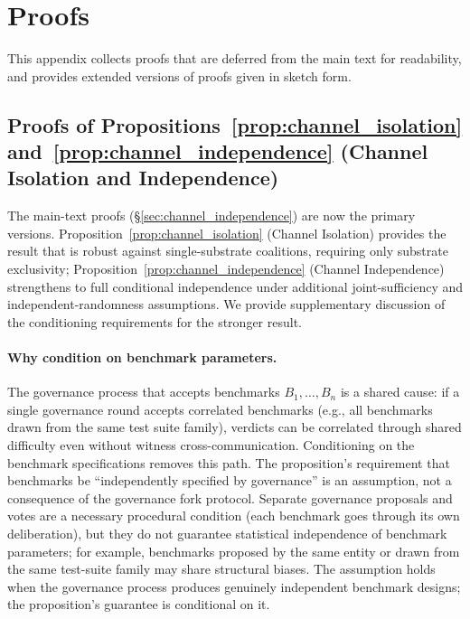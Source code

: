 \section{Proofs}
\label{app:proofs}

This appendix collects proofs that are deferred from the main text
for readability, and provides extended versions of proofs given in
sketch form.

\subsection{Proofs of Propositions~\ref{prop:channel_isolation}
and~\ref{prop:channel_independence}
(Channel Isolation and Independence)}
\label{app:channel_independence}

The main-text proofs (\S\ref{sec:channel_independence}) are now the
primary versions.  Proposition~\ref{prop:channel_isolation} (Channel
Isolation) provides the result that is robust against single-substrate
coalitions, requiring only substrate exclusivity;
Proposition~\ref{prop:channel_independence}
(Channel Independence) strengthens to full conditional independence
under additional joint-sufficiency and independent-randomness
assumptions.
We provide supplementary discussion of the conditioning requirements
for the stronger result.

\paragraph{Why condition on benchmark parameters.}
The governance process that accepts benchmarks $B_1, \ldots, B_n$ is
a shared cause: if a single governance round accepts correlated
benchmarks (e.g., all benchmarks drawn from the same test suite family),
verdicts can be correlated through shared difficulty even without
witness cross-communication.  Conditioning on the benchmark specifications
removes this path.  The proposition's requirement that benchmarks be
``independently specified by governance'' is an assumption, not a
consequence of the governance fork protocol.  Separate governance
proposals and votes are a necessary procedural condition (each
benchmark goes through its own deliberation), but they do not
guarantee statistical independence of benchmark parameters; for
example, benchmarks proposed by the same entity or drawn from the
same test-suite family may share structural biases.  The assumption
holds when the governance process produces genuinely independent
benchmark designs; the proposition's guarantee is conditional on it.

